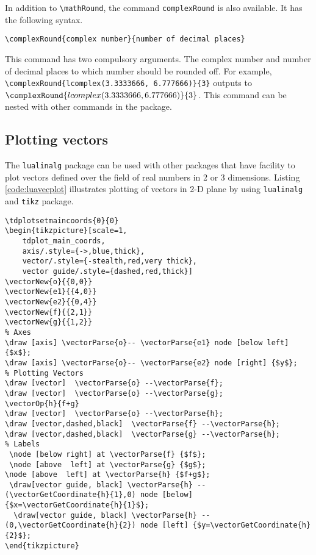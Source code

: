 \documentclass{article}
\begin{document}
In addition to \verb|\mathRound|, the command \verb|complexRound| is also available. It has the following syntax.
\begin{verbatim}
\complexRound{complex number}{number of decimal places}
\end{verbatim}

This command has two compulsory arguments. The complex number and number of decimal places to which number should be rounded off.  For example,
 \verb| \complexRound{lcomplex(3.3333666, 6.777666)}{3}| outputs to \(\complexRound{lcomplex(3.3333666, 6.777666)}{3}\).  This command can be nested with other commands in the package.

\subsection{Plotting  vectors}
The \verb|lualinalg| package can be used with other packages that have facility to plot vectors defined over the field of real numbers in 2 or 3 dimensions. Listing \ref{code:luavecplot} illustrates plotting of vectors in 2-D plane by using \verb|lualinalg| and \verb|tikz| package.
\begin{lstlisting}[label={code:luavecplot},  caption={Plotting vectors in 2-dimensions with the lualinalg and tikz packages}]
\tdplotsetmaincoords{0}{0}
\begin{tikzpicture}[scale=1,
    tdplot_main_coords,
    axis/.style={->,blue,thick},
    vector/.style={-stealth,red,very thick},
    vector guide/.style={dashed,red,thick}]
\vectorNew{o}{{0,0}}
\vectorNew{e1}{{4,0}}
\vectorNew{e2}{{0,4}}
\vectorNew{f}{{2,1}}
\vectorNew{g}{{1,2}}
% Axes
\draw [axis] \vectorParse{o}-- \vectorParse{e1} node [below left] {$x$};
\draw [axis] \vectorParse{o}-- \vectorParse{e2} node [right] {$y$};
% Plotting Vectors
\draw [vector]  \vectorParse{o} --\vectorParse{f};
\draw [vector]  \vectorParse{o} --\vectorParse{g};
\vectorOp{h}{f+g}
\draw [vector]  \vectorParse{o} --\vectorParse{h};
\draw [vector,dashed,black]  \vectorParse{f} --\vectorParse{h};
\draw [vector,dashed,black]  \vectorParse{g} --\vectorParse{h};
% Labels
 \node [below right] at \vectorParse{f} {$f$};
 \node [above  left] at \vectorParse{g} {$g$};
\node [above  left] at \vectorParse{h} {$f+g$};
 \draw[vector guide, black] \vectorParse{h} -- (\vectorGetCoordinate{h}{1},0) node [below] {$x=\vectorGetCoordinate{h}{1}$};
  \draw[vector guide, black] \vectorParse{h} -- (0,\vectorGetCoordinate{h}{2}) node [left] {$y=\vectorGetCoordinate{h}{2}$};
\end{tikzpicture}
\end{lstlisting}
\end{document}
